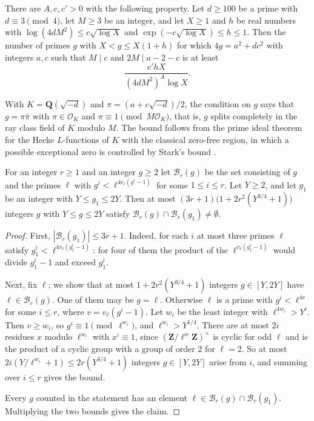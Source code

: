 \begin{theorem}\label{hf-norm-primes-short}
There are $A,c,c'>0$ with the following property. Let $d\geq100$ be a prime with $d\equiv3\pmod4$,
let $M\geq3$ be an integer, and let $X\geq1$ and $h$ be real numbers with
$\log(4dM^2)\leq c\sqrt{\log X}$ and $\exp(-c\sqrt{\log X})\leq h\leq1$. Then the number of primes
$g$ with $X<g\leq X(1+h)$ for which $4g=a^2+dc^2$ with integers $a,c$ such that $M\mid c$ and
$2M\mid a-2-c$ is at least
\[
 \frac{c'hX}{(4dM^2)^A\log X}.
\]
\end{theorem}

With $K=\mathbf Q(\sqrt{-d})$ and $\pi=(a+c\sqrt{-d})/2$, the condition on $g$ says that
$g=\pi\bar\pi$ with $\pi\in\mathcal O_K$ and $\pi\equiv1\pmod{M\mathcal O_K}$, that is, $g$ splits
completely in the ray class field of $K$ modulo $M$. The bound follows from the prime ideal theorem
for the Hecke $L$-functions of $K$ with the classical zero-free region, in which a possible
exceptional zero is controlled by Stark's bound \cite{LO77,Sta74}.

\begin{lemma}\label{hf-exceptional-primes}
For an integer $r\geq1$ and an integer $g\geq2$ let $\mathcal B_r(g)$ be the set consisting of $g$
and the primes $\ell$ with $g^i<\ell^{4v_\ell(g^i-1)}$ for some $1\leq i\leq r$. Let $Y\geq2$, and
let $g_1$ be an integer with $Y\leq g_1\leq2Y$. Then at most
$(3r+1)\bigl(1+2r^2(Y^{3/4}+1)\bigr)$ integers $g$ with $Y\leq g\leq2Y$ satisfy
$\mathcal B_r(g)\cap\mathcal B_r(g_1)\neq\emptyset$.
\end{lemma}

\begin{proof}
First, $|\mathcal B_r(g_1)|\leq3r+1$. Indeed, for each $i$ at most three primes $\ell$ satisfy
$g_1^i<\ell^{4v_\ell(g_1^i-1)}$: for four of them the product of the $\ell^{v_\ell(g_1^i-1)}$ would
divide $g_1^i-1$ and exceed $g_1^i$.

Next, fix $\ell$; we show that at most $1+2r^2(Y^{3/4}+1)$ integers $g\in[Y,2Y]$ have
$\ell\in\mathcal B_r(g)$. One of them may be $g=\ell$. Otherwise $\ell$ is a prime with
$g^i<\ell^{4v}$ for some $i\leq r$, where $v=v_\ell(g^i-1)$. Let $w_i$ be the least integer with
$\ell^{4w_i}>Y^i$. Then $v\geq w_i$, so $g^i\equiv1\pmod{\ell^{w_i}}$, and $\ell^{w_i}>Y^{1/4}$.
There are at most $2i$ residues $x$ modulo $\ell^{w_i}$ with $x^i\equiv1$, since
$(\mathbf Z/\ell^{w}\mathbf Z)^\times$ is cyclic for odd $\ell$ and is the product of a cyclic group
with a group of order $2$ for $\ell=2$. So at most $2i(Y/\ell^{w_i}+1)\leq2r(Y^{3/4}+1)$ integers
$g\in[Y,2Y]$ arise from $i$, and summing over $i\leq r$ gives the bound.

Every $g$ counted in the statement has an element $\ell\in\mathcal B_r(g)\cap\mathcal B_r(g_1)$.
Multiplying the two bounds gives the claim.
\end{proof}

